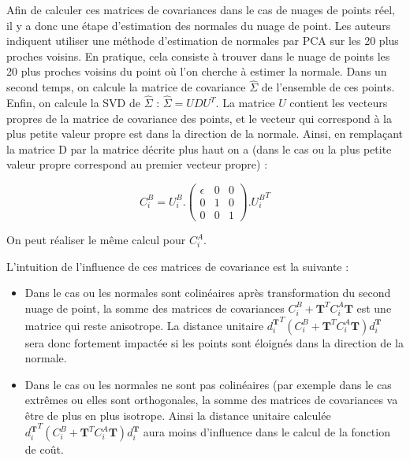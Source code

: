 Afin de calculer ces matrices de covariances dans le cas de nuages de points réel, il y a donc une étape d'estimation des normales du nuage de point. Les auteurs indiquent utiliser une méthode d'estimation de normales par PCA sur les 20 plus proches voisins. En pratique, cela consiste à trouver dans le nuage de points les 20 plus proches voisins du point où l'on cherche à estimer la normale. Dans un second temps, on calcule la matrice de covariance $\hat{\Sigma}$ de l'ensemble de ces points. Enfin, on calcule la SVD de $\hat{\Sigma}$ : $\hat{\Sigma} = UDU^{T}$. La matrice $U$ contient les vecteurs propres de la matrice de covariance des points, et le vecteur qui correspond à la plus petite valeur propre est dans la direction de la normale. Ainsi, en remplaçant la matrice D par la matrice décrite plus haut on a (dans le cas ou la plus petite valeur propre correspond au premier vecteur propre) :

\begin{equation}
C_{i}^B = U_{i}^B.\begin{pmatrix} 
 \epsilon & 0 & 0 \\
 0 & 1 & 0 \\ 
 0 & 0 & 1 
 \end{pmatrix}.{U_{i}^{B}}^T
\end{equation}

On peut réaliser le même calcul pour $C_{i}^A$.

L'intuition de l'influence de ces matrices de covariance est la suivante :\\

\begin{itemize}
\item{Dans le cas ou les normales sont colinéaires après transformation du second nuage de point, la somme des matrices de covariances $C_{i}^B + \mathbf{T}^{T}C_{i}^{A}\mathbf{T}$ est une matrice qui reste anisotrope. La distance unitaire ${d_{i}^{\mathbf{T}}}^{T}(C_{i}^B + \mathbf{T}^{T}C_{i}^{A}\mathbf{T})d_{i}^{\mathbf{T}}$ sera donc fortement impactée si les points sont éloignés dans la direction de la normale.  
}

\item{Dans le cas ou les normales ne sont pas colinéaires (par exemple dans le cas extrêmes ou elles sont orthogonales}, la somme des matrices de covariances va être de plus en plus isotrope. Ainsi la distance unitaire calculée ${d_{i}^{\mathbf{T}}}^{T}(C_{i}^B + \mathbf{T}^{T}C_{i}^{A}\mathbf{T})d_{i}^{\mathbf{T}}$ aura moins d'influence dans le calcul de la fonction de coût.
\end{itemize}

